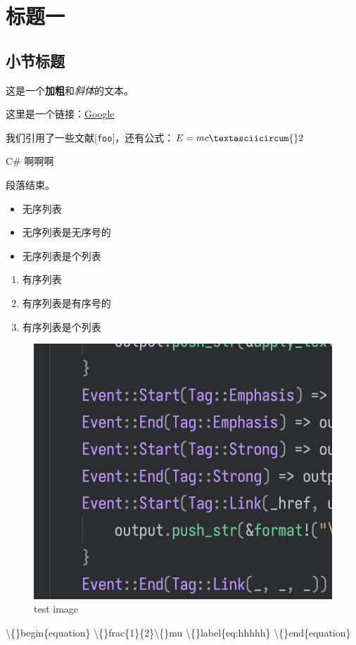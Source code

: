 \chapter{标题一}
\section{小节标题}
这是一个\textbf{加粗}和\textit{斜体}的文本。

这里是一个链接：\href{https://www.google.com}{Google}

我们引用了一些文献[\texttt{foo}]，还有公式：$E = mc\textasciicircum{}2$

C\# 啊啊啊

段落结束。

\begin{itemize}
\item 无序列表
\item 无序列表是无序号的
\item 无序列表是个列表
\end{itemize}
\begin{enumerate}
\item 有序列表
\item 有序列表是有序号的
\item 有序列表是个列表
\end{enumerate}
\begin{figure}[h]
\includegraphics{images/test.jpg}
\caption{test image}
\label{fig:images/test.jpg}
\end{figure}


\textbackslash\{\}begin\{equation\}
\textbackslash\{\}frac\{1\}\{2\}\textbackslash\{\}mu
\textbackslash\{\}label\{eq:hhhhh\}
\textbackslash\{\}end\{equation\}

